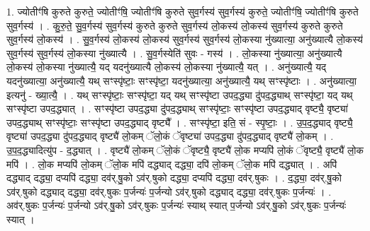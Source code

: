 \documentclass[17pt]{extarticle}
\begin{document}
1. ज्योतीꣳ॑षि कुरुते कुरुते॒ ज्योतीꣳ॑षि॒ ज्योतीꣳ॑षि कुरुते सुव॒र्गस्य॑ सुव॒र्गस्य॑ कुरुते॒ ज्योतीꣳ॑षि॒ ज्योतीꣳ॑षि कुरुते सुव॒र्गस्य॑ । . कु॒रु॒ते॒ सु॒व॒र्गस्य॑ सुव॒र्गस्य॑ कुरुते कुरुते सुव॒र्गस्य॑ लो॒कस्य॑ लो॒कस्य॑ सुव॒र्गस्य॑ कुरुते कुरुते सुव॒र्गस्य॑ लो॒कस्य॑ । . सु॒व॒र्गस्य॑ लो॒कस्य॑ लो॒कस्य॑ सुव॒र्गस्य॑ सुव॒र्गस्य॑ लो॒कस्या नु॑ख्यात्या॒ अनु॑ख्यात्यै लो॒कस्य॑ सुव॒र्गस्य॑ सुव॒र्गस्य॑ लो॒कस्या नु॑ख्यात्यै । . सु॒व॒र्गस्येति॑ सुवः - गस्य॑ । . लो॒कस्या नु॑ख्यात्या॒ अनु॑ख्यात्यै लो॒कस्य॑ लो॒कस्या नु॑ख्यात्यै॒ यद् यदनु॑ख्यात्यै लो॒कस्य॑ लो॒कस्या नु॑ख्यात्यै॒ यत् । . अनु॑ख्यात्यै॒ यद् यदनु॑ख्यात्या॒ अनु॑ख्यात्यै॒ यथ् सꣳस्पृ॑ष्टाः॒ सꣳस्पृ॑ष्टा॒ यदनु॑ख्यात्या॒ अनु॑ख्यात्यै॒ यथ् सꣳस्पृ॑ष्टाः । . अनु॑ख्यात्या॒ इत्यनु॑ - ख्या॒त्यै॒ । . यथ् सꣳस्पृ॑ष्टाः॒ सꣳस्पृ॑ष्टा॒ यद् यथ् सꣳस्पृ॑ष्टा उपद॒द्ध्या दु॑पद॒द्ध्याथ् सꣳस्पृ॑ष्टा॒ यद् यथ् सꣳस्पृ॑ष्टा उपद॒द्ध्यात् । . सꣳस्पृ॑ष्टा उपद॒द्ध्या दु॑पद॒द्ध्याथ् सꣳस्पृ॑ष्टाः॒ सꣳस्पृ॑ष्टा उपद॒द्ध्याद् वृष्ट्यै॒ वृष्ट्या॑ उपद॒द्ध्याथ् सꣳस्पृ॑ष्टाः॒ सꣳस्पृ॑ष्टा उपद॒द्ध्याद् वृष्ट्यै᳚ । . सꣳस्पृ॑ष्टा॒ इति॒ सं - स्पृ॒ष्टाः॒ । . उ॒प॒द॒द्ध्याद् वृष्ट्यै॒ वृष्ट्या॑ उपद॒द्ध्या दु॑पद॒द्ध्याद् वृष्ट्यै॑ लो॒कम् ॅलो॒कं ॅवृष्ट्या॑ उपद॒द्ध्या दु॑पद॒द्ध्याद् वृष्ट्यै॑ लो॒कम् । . उ॒प॒द॒द्ध्यादित्यु॑प - द॒द्ध्यात् । . वृष्ट्यै॑ लो॒कम् ॅलो॒कं ॅवृष्ट्यै॒ वृष्ट्यै॑ लो॒क मप्यपि॑ लो॒कं ॅवृष्ट्यै॒ वृष्ट्यै॑ लो॒क मपि॑ । . लो॒क मप्यपि॑ लो॒कम् ॅलो॒क मपि॑ दद्ध्याद् दद्ध्या॒ दपि॑ लो॒कम् ॅलो॒क मपि॑ दद्ध्यात् । . अपि॑ दद्ध्याद् दद्ध्या॒ दप्यपि॑ दद्ध्या॒ दव॑र्.षु॒को ऽव॑र्.षुको दद्ध्या॒ दप्यपि॑ दद्ध्या॒ दव॑र्.षुकः । . द॒द्ध्या॒ दव॑र्.षु॒को ऽव॑र्.षुको दद्ध्याद् दद्ध्या॒ दव॑र्.षुकः प॒र्जन्यः॑ प॒र्जन्यो ऽव॑र्.षुको दद्ध्याद् दद्ध्या॒ दव॑र्.षुकः प॒र्जन्यः॑ । . अव॑र्.षुकः प॒र्जन्यः॑ प॒र्जन्यो ऽव॑र्.षु॒को ऽव॑र्.षुकः प॒र्जन्यः॑ स्याथ् स्यात् प॒र्जन्यो ऽव॑र्.षु॒को ऽव॑र्.षुकः प॒र्जन्यः॑ स्यात् । \newline
\end{document}
